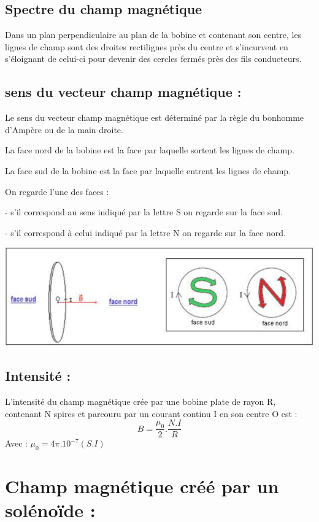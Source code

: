 \documentclass[12pt]{article}
\begin{document}
\subsection{ Spectre du champ magnétique}
Dans un plan perpendiculaire au plan de la bobine et
contenant son centre, les lignes de champ sont des droites
rectilignes près du centre et s’incurvent en s’éloignant de
celui-ci pour devenir des cercles fermés près des fils
conducteurs.

\subsection{sens du vecteur champ magnétique :}

Le sens du vecteur champ magnétique est déterminé par la règle du bonhomme d’Ampère ou de la
main droite.

La face nord de la bobine est la face par laquelle sortent les lignes de champ.

La face sud de la bobine est la face par laquelle entrent les lignes de champ.

On regarde l’une des faces :

- s’il correspond au sens indiqué par la lettre S on regarde sur la face sud.

- s’il correspond à celui indiqué par la lettre N on regarde sur la face nord.

\begin{center}
\includegraphics[width=1\textwidth]{./img/sens_plate_mag.png}
\end{center}


\subsection{Intensité :}
L’intensité du champ magnétique crée par une bobine plate de rayon R, contenant N spires et
parcouru par un courant continu I en son centre O est :
$$B = \frac{\mu_0}{2}.\frac{N.I}{R}$$
Avec : $\mu_0 = 4\pi.10^{-7}(S. I)$

\section{Champ magnétique créé par un solénoïde :}
\end{document}
